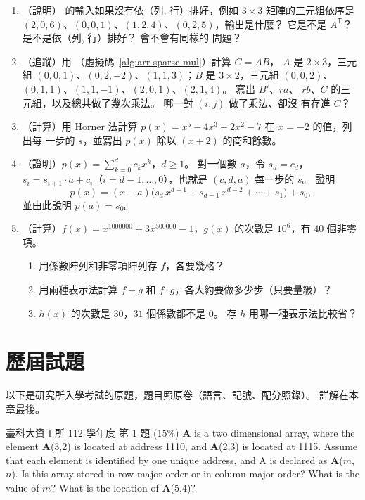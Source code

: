 \begin{enumerate}
\item （說明） 的輸入如果沒有依（列, 行）排好，例如 $3 \times 3$
矩陣的三元組依序是 $(2,0,6)$、$(0,0,1)$、$(1,2,4)$、$(0,2,5)$，輸出是什麼？ 它是不是
$A^{\mathsf T}$？ 是不是依（列, 行）排好？  會不會有同樣的
問題？

\item （追蹤）用 （虛擬碼~\ref{alg:arr-sparse-mul}）計算 $C = AB$，
$A$ 是 $2 \times 3$，三元組 $(0,0,1)$、$(0,2,-2)$、$(1,1,3)$；$B$ 是 $3 \times 2$，三元組
$(0,0,2)$、$(0,1,1)$、$(1,1,-1)$、$(2,0,1)$、$(2,1,4)$。 寫出 $B'$、$\mathit{ra}$、
$\mathit{rb}$、$C$ 的三元組，以及總共做了幾次乘法。 哪一對 $(i, j)$ 做了乘法、卻沒
有存進 $C$？

\item （計算）用 Horner 法計算 $p(x) = x^5 - 4x^3 + 2x^2 - 7$ 在 $x = -2$ 的值，列出每
一步的 $s$，並寫出 $p(x)$ 除以 $(x + 2)$ 的商和餘數。

\item （證明）$p(x) = \sum_{k=0}^{d} c_k x^k$，$d \ge 1$。 對一個數 $a$，令 $s_d =
c_d$，$s_i = s_{i+1} \cdot a + c_i$（$i = d - 1, \ldots, 0$），也就是 
$(c, d, a)$ 每一步的 $s$。 證明
\[
p(x) = (x - a)\bigl(s_d\,x^{d-1} + s_{d-1}\,x^{d-2} + \cdots + s_1\bigr) + s_0 ,
\]
並由此說明 $p(a) = s_0$。

\item （計算）$f(x) = x^{1000000} + 3x^{500000} - 1$，$g(x)$ 的次數是 $10^6$，有
$40$ 個非零項。
\begin{enumerate}
\item 用係數陣列和非零項陣列存 $f$，各要幾格？
\item 用兩種表示法計算 $f + g$ 和 $f \cdot g$，各大約要做多少步（只要量級）？
\item $h(x)$ 的次數是 $30$，$31$ 個係數都不是 $0$。 存 $h$ 用哪一種表示法比較省？
\end{enumerate}
\end{enumerate}

\section{歷屆試題}
\label{sec:arr-pastexam}

以下是研究所入學考試的原題，題目照原卷（語言、記號、配分照錄）。 詳解在本章最後。

\begin{pastexam}[label={px:arr-1}]{臺科大資工所 112 學年度 第 1 題}
(15\%) \textbf{A} is a two dimensional array, where the element \textbf{A}(3,2) is
located at address 1110, and \textbf{A}(2,3) is located at 1115. Assume that each element
is identified by one unique address, and A is declared as \textbf{A}($m$,$n$). Is this
array stored in row-major order or in column-major order? What is the value of $m$? What
is the location of \textbf{A}(5,4)?
\end{pastexam}

